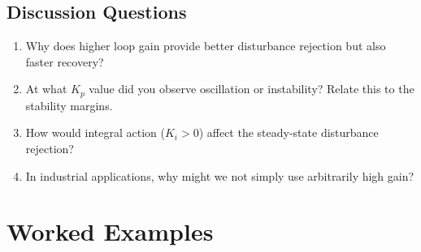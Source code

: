 \subsection{Discussion Questions}

\begin{enumerate}
\item Why does higher loop gain provide better disturbance rejection but also faster recovery?

\item At what $K_p$ value did you observe oscillation or instability? Relate this to the stability margins.

\item How would integral action ($K_i > 0$) affect the steady-state disturbance rejection?

\item In industrial applications, why might we not simply use arbitrarily high gain?
\end{enumerate}

\section{Worked Examples}
\label{sec:worked_examples}

